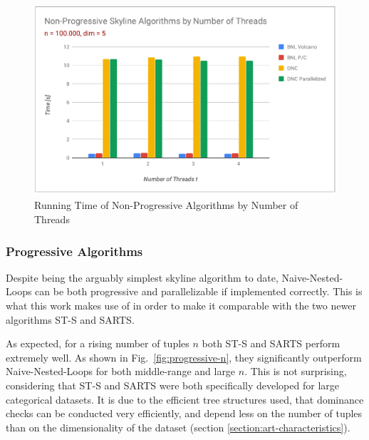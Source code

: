 \begin{figure}[h]
	\centering
	\includegraphics[width=1\linewidth]{figures/non-progressive-threads}
	\caption{Running Time of Non-Progressive Algorithms by Number of Threads}
	\label{fig:non-progressive-threads}
\end{figure}

\subsubsection{Progressive Algorithms}
Despite being the arguably simplest skyline algorithm to date, Naive-Nested-Loops can be both progressive and parallelizable if implemented correctly. This is what this work makes use of in order to make it comparable with the two newer algorithms ST-S and SARTS. 

As expected, for a rising number of tuples $n$ both ST-S and SARTS perform extremely well. As shown in Fig.~\ref{fig:progressive-n}, they significantly outperform Naive-Nested-Loops for both middle-range and large $n$. This is not surprising, considering that ST-S and SARTS were both specifically developed for large categorical datasets. It is due to the efficient tree structures used,  that dominance checks can be conducted very efficiently, and depend less on the number of tuples than on the dimensionality of the dataset (section \ref{section:art-characteristics}). 

